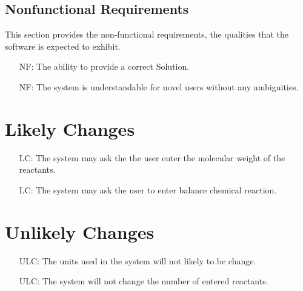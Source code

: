 \documentclass[12pt]{article}
\newcounter{reqnum} %
\newcounter{nfreqnum} %
\newcounter{lcnum} %
\newcounter{ulcnum} %
\begin{document}
\subsection{Nonfunctional Requirements}

This section provides the non-functional requirements, the qualities that the software is
expected to exhibit.\\

\noindent \begin{itemize}
\item[NF\refstepcounter{nfreqnum}\thenfreqnum \label{Accuracy}:]  The ability to provide a correct Solution.\\
\item[NF\refstepcounter{nfreqnum}\thenfreqnum \label{Understandability}:]  The system is understandable for novel users without any ambiguities.\\
\end{itemize}

\section{Likely Changes}    

\noindent \begin{itemize}

\item[LC\refstepcounter{lcnum}\thelcnum\label{Molecular weight}:] The system may ask the the user enter the molecular weight of the reactants.
\item[LC\refstepcounter{lcnum}\thelcnum\label{balance}:] The system may ask the user to enter balance chemical reaction.



\end{itemize}

\section{Unlikely Changes}    

\noindent \begin{itemize}

\item[ULC\refstepcounter{ulcnum}\theulcnum\label{Units}:] The units used in the system will not likely to be change.
\item[ULC\refstepcounter{ulcnum}\theulcnum\label{reactant}:] The system will not change the number of entered reactants. 

\end{itemize}
\end{document}
